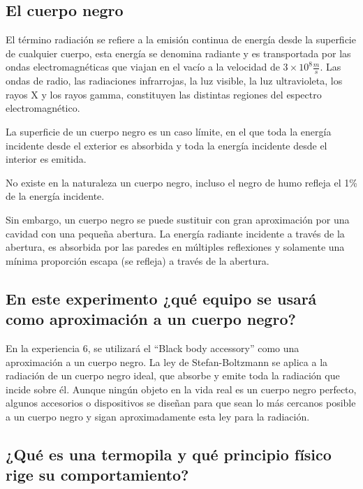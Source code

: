 \documentclass[twocolumn, 12pt]{article}
\begin{document}
\subsection{El cuerpo negro~\cite{El_cuerpo_negro}}

El término radiación se refiere a la emisión continua de
energía desde la superficie de cualquier cuerpo, esta
energía se denomina radiante y es transportada por las
ondas electromagnéticas que viajan en el vacío a la
velocidad de $3 \times 10^{8} \frac{m}{s}$. Las ondas de
radio, las radiaciones infrarrojas, la luz visible, la luz
ultravioleta, los rayos X y los rayos gamma, constituyen
las distintas regiones del espectro electromagnético.

La superficie de un cuerpo negro es un caso límite, en el
que toda la energía incidente desde el exterior es
absorbida y toda la energía incidente desde el interior es
emitida.

No existe en la naturaleza un cuerpo negro, incluso el
negro de humo refleja el 1\% de la energía incidente.

Sin embargo, un cuerpo negro se puede sustituir con gran
aproximación por una cavidad con una pequeña abertura. La
energía radiante incidente a través de la abertura, es
absorbida por las paredes en múltiples reflexiones y
solamente una mínima proporción escapa (se refleja) a
través de la abertura.

\subsection{En este experimento ¿qué equipo se usará como aproximación a un cuerpo
      negro?}

En la experiencia 6, se utilizará el ``Black body
accessory'' como una aproximación a un cuerpo negro. La ley
de Stefan-Boltzmann se aplica a la radiación de un cuerpo
negro ideal, que absorbe y emite toda la radiación que
incide sobre él. Aunque ningún objeto en la vida real es un
cuerpo negro perfecto, algunos accesorios o dispositivos se
diseñan para que sean lo más cercanos posible a un cuerpo
negro y sigan aproximadamente esta ley para la radiación.

\subsection{¿Qué es una termopila y qué principio físico rige su comportamiento?}
\end{document}
